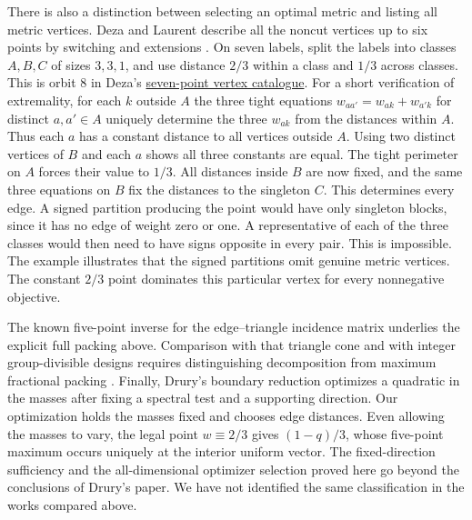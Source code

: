 \documentclass[11pt]{article}
\begin{document}
There is also a distinction between selecting an optimal metric and listing all metric vertices. Deza and Laurent describe all the noncut vertices up to six points by switching and extensions \cite[section 31.6]{Book}. On seven labels, split the labels into classes $A,B,C$ of sizes $3,3,1$, and use distance $2/3$ within a class and $1/3$ across classes. This is orbit 8 in Deza's \href{https://www.cas.mcmaster.ca/~deza/ext/metric_7.ext}{seven-point vertex catalogue}. For a short verification of extremality, for each $k$ outside $A$ the three tight equations $w_{aa'}=w_{ak}+w_{a'k}$ for distinct $a,a'\in A$ uniquely determine the three $w_{ak}$ from the distances within $A$. Thus each $a$ has a constant distance to all vertices outside $A$. Using two distinct vertices of $B$ and each $a$ shows all three constants are equal. The tight perimeter on $A$ forces their value to $1/3$. All distances inside $B$ are now fixed, and the same three equations on $B$ fix the distances to the singleton $C$. This determines every edge. A signed partition producing the point would have only singleton blocks, since it has no edge of weight zero or one. A representative of each of the three classes would then need to have signs opposite in every pair. This is impossible. The example illustrates that the signed partitions omit genuine metric vertices. The constant $2/3$ point dominates this particular vertex for every nonnegative objective.

The known five-point inverse for the edge--triangle incidence matrix \cite[Proposition 2.2]{Dukes} underlies the explicit full packing above. Comparison with that triangle cone and with integer group-divisible designs requires distinguishing decomposition from maximum fractional packing \cite{Dukes,Colbourn}. Finally, Drury's boundary reduction \cite[Lemma 12, pp.~167--168]{Drury} optimizes a quadratic in the masses after fixing a spectral test and a supporting direction. Our optimization holds the masses fixed and chooses edge distances. Even allowing the masses to vary, the legal point $w\equiv2/3$ gives $(1-q)/3$, whose five-point maximum occurs uniquely at the interior uniform vector. The fixed-direction sufficiency and the all-dimensional optimizer selection proved here go beyond the conclusions of Drury's paper. We have not identified the same classification in the works compared above.
\end{document}
